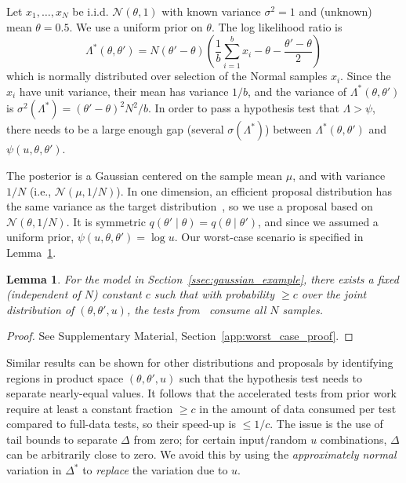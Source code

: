 \documentclass[twoside]{article} \usepackage{aistats2017}
\newtheorem{lemma}{Lemma}
\begin{document}
Let $x_1,\ldots,x_N$ be i.i.d. $\mathcal{N}(\theta,1)$ with known variance
$\sigma^2=1$ and (unknown) mean $\theta=0.5$. We use a uniform prior on
$\theta$. The log likelihood ratio is
\begin{equation}\label{eq:lemma_ll_ratio}
    \Lambda^*(\theta,\theta') = N(\theta'-\theta)\left(\frac{1}{b}\sum_{i=1}^b x_i-\theta-\frac{\theta'-\theta}{2}\right)
\end{equation}
which is normally distributed over selection of the Normal samples $x_i$.  Since
the $x_i$ have unit variance, their mean has variance $1/b$, and the variance of
$\Lambda^*(\theta,\theta')$ is $\sigma^2(\Lambda^*) = (\theta'-\theta)^2N^2/b$.
In order to pass a hypothesis test that $\Lambda > \psi$, there needs to be a
large enough gap (several $\sigma(\Lambda^*)$) between
$\Lambda^*(\theta,\theta')$ and $\psi(u,\theta,\theta')$. 

The posterior is a Gaussian centered on the sample mean $\mu$, and with variance
$1/N$ (i.e., $\mathcal{N}(\mu, 1/N)$). In one dimension, an efficient proposal
distribution has the same variance as the target
distribution~\citep{OptimalScaling01}, so we use a proposal based on
$\mathcal{N}(\theta,1/N)$. It is symmetric
$q(\theta'\mid\theta)=q(\theta\mid\theta')$, and since we assumed a uniform
prior, $\psi(u,\theta,\theta')=\log u$. Our worst-case scenario is specified in
Lemma~\ref{lem:worst_case}.

\begin{lemma}\label{lem:worst_case}
    For the model in Section~\ref{ssec:gaussian_example}, there exists a fixed
    (independent of $N$) constant $c$ such that with probability $\geq c$ over
    the joint distribution of $(\theta, \theta', u)$, the tests
    from~\cite{cutting_mh_2014,icml2014c1_bardenet14} consume all $N$ samples. 
\end{lemma}
\vspace{-1em}
\begin{proof}
See Supplementary Material, Section~\ref{app:worst_case_proof}.
\end{proof}
Similar results can be shown for other distributions and proposals by
identifying regions in product space $(\theta,\theta',u)$ such that the
hypothesis test needs to separate nearly-equal values.  It follows that the
accelerated tests from prior work require at least a constant fraction $\geq c$
in the amount of data consumed per test compared to full-data tests, so their
speed-up is $\le 1/c$. The issue is the use of tail bounds to separate $\Delta$
from zero; for certain input/random $u$ combinations, $\Delta$ can be
arbitrarily close to zero. We avoid this by using the {\em approximately normal}
variation in $\Delta^*$ to {\em replace} the variation due to $u$. 
\end{document}
